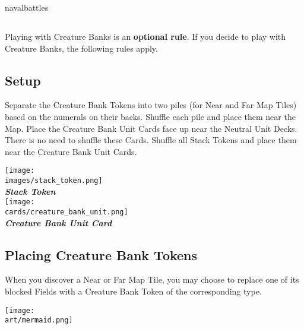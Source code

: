 \begin{expansion}[before=\vspace*{-11mm}]{navalbattles}
  \begin{multicols*}{2}
  \subsection*{}
  Playing with Creature Banks is an \textbf{optional rule}.
  If you decide to play with Creature Banks, the following rules apply.

  \bigskip
  \subsection*{Setup}
  Separate the Creature Bank Tokens into two piles (for Near and Far Map Tiles) based on the numerals on their backs.
  Shuffle each pile and place them near the Map.
  Place the Creature Bank Unit Cards face up near the Neutral Unit Decks.
  There is no need to shuffle these Cards.
  Shuffle all Stack Tokens and place them near the Creature Bank Unit Cards.

  \bigskip
  \begin{multicols*}{2}
    \begin{center}
      \vspace*{\fill}
      \texttt{[image: \\images/stack\_token.png]}\\
      \textbf{\footnotesize\textit{\textcolor{darkcandyapplered}{Stack Token}}}\\
      \vspace*{\fill}
      \columnbreak
      \texttt{[image: \\cards/creature\_bank\_unit.png]}\\
      \textbf{\footnotesize\textit{\textcolor{darkcandyapplered}{Creature Bank Unit Card}}}
    \end{center}
  \end{multicols*}

  \subsection*{Placing Creature Bank Tokens}
  When you discover a Near or Far Map Tile, you may choose to replace one of its blocked Fields with a Creature Bank Token of the corresponding type.\par

  \begin{center}
    \texttt{[image: \\art/mermaid.png]}
  \end{center}
  \columnbreak


\end{multicols*}
\end{expansion}
